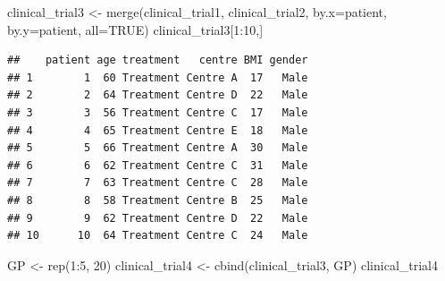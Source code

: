 \documentclass[]{article}
\newenvironment{Shaded}{\begin{snugshade}}{\end{snugshade}}
\newcommand{\AttributeTok}[1]{\textcolor[rgb]{0.77,0.63,0.00}{#1}}
\newcommand{\ConstantTok}[1]{\textcolor[rgb]{0.00,0.00,0.00}{#1}}
\newcommand{\DecValTok}[1]{\textcolor[rgb]{0.00,0.00,0.81}{#1}}
\newcommand{\FunctionTok}[1]{\textcolor[rgb]{0.00,0.00,0.00}{#1}}
\newcommand{\NormalTok}[1]{#1}
\newcommand{\OtherTok}[1]{\textcolor[rgb]{0.56,0.35,0.01}{#1}}
\newcommand{\SpecialCharTok}[1]{\textcolor[rgb]{0.00,0.00,0.00}{#1}}
\newcommand{\StringTok}[1]{\textcolor[rgb]{0.31,0.60,0.02}{#1}}
\begin{document}
\begin{Shaded}
\begin{Highlighting}[]
\NormalTok{clinical\_trial3 }\OtherTok{\textless{}{-}} \FunctionTok{merge}\NormalTok{(clinical\_trial1, clinical\_trial2, }\AttributeTok{by.x=}\StringTok{\textquotesingle{}patient\textquotesingle{}}\NormalTok{, }\AttributeTok{by.y=}\StringTok{\textquotesingle{}patient\textquotesingle{}}\NormalTok{,}
                         \AttributeTok{all=}\ConstantTok{TRUE}\NormalTok{)}
\NormalTok{clinical\_trial3[}\DecValTok{1}\SpecialCharTok{:}\DecValTok{10}\NormalTok{,]}
\end{Highlighting}
\end{Shaded}

\begin{verbatim}
##    patient age treatment   centre BMI gender
## 1        1  60 Treatment Centre A  17   Male
## 2        2  64 Treatment Centre D  22   Male
## 3        3  56 Treatment Centre C  17   Male
## 4        4  65 Treatment Centre E  18   Male
## 5        5  66 Treatment Centre A  30   Male
## 6        6  62 Treatment Centre C  31   Male
## 7        7  63 Treatment Centre C  28   Male
## 8        8  58 Treatment Centre B  25   Male
## 9        9  62 Treatment Centre D  22   Male
## 10      10  64 Treatment Centre C  24   Male
\end{verbatim}

\begin{Shaded}
\begin{Highlighting}[]
\NormalTok{GP }\OtherTok{\textless{}{-}} \FunctionTok{rep}\NormalTok{(}\DecValTok{1}\SpecialCharTok{:}\DecValTok{5}\NormalTok{, }\DecValTok{20}\NormalTok{)}
\NormalTok{clinical\_trial4 }\OtherTok{\textless{}{-}} \FunctionTok{cbind}\NormalTok{(clinical\_trial3, GP)}
\NormalTok{clinical\_trial4}
\end{Highlighting}
\end{Shaded}
\end{document}
